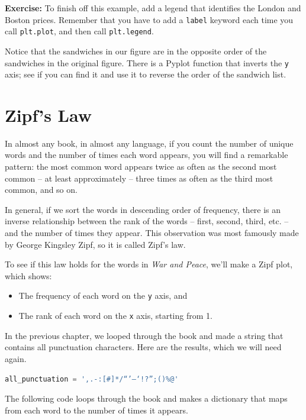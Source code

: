 \textbf{Exercise:} To finish off this example, add a legend that
identifies the London and Boston prices. Remember that you have to add a
\passthrough{\lstinline!label!} keyword each time you call
\passthrough{\lstinline!plt.plot!}, and then call
\passthrough{\lstinline!plt.legend!}.

Notice that the sandwiches in our figure are in the opposite order of
the sandwiches in the original figure. There is a Pyplot function that
inverts the \passthrough{\lstinline!y!} axis; see if you can find it and
use it to reverse the order of the sandwich list.

\hypertarget{zipfs-law}{%
\section{Zipf's Law}\label{zipfs-law}}

In almost any book, in almost any language, if you count the number of
unique words and the number of times each word appears, you will find a
remarkable pattern: the most common word appears twice as often as the
second most common -- at least approximately -- three times as often as
the third most common, and so on.

In general, if we sort the words in descending order of frequency, there
is an inverse relationship between the rank of the words -- first,
second, third, etc. -- and the number of times they appear. This
observation was most famously made by George Kingsley Zipf, so it is
called Zipf's law.

To see if this law holds for the words in \emph{War and Peace}, we'll
make a Zipf plot, which shows:

\begin{itemize}
\item
  The frequency of each word on the \passthrough{\lstinline!y!} axis,
  and
\item
  The rank of each word on the \passthrough{\lstinline!x!} axis,
  starting from 1.
\end{itemize}

In the previous chapter, we looped through the book and made a string
that contains all punctuation characters. Here are the results, which we
will need again.

\begin{lstlisting}[language=Python,style=source]
all_punctuation = ',.-:[#]*/“’—‘!?”;()%@'
\end{lstlisting}

The following code loops through the book and makes a dictionary that
maps from each word to the number of times it appears.

